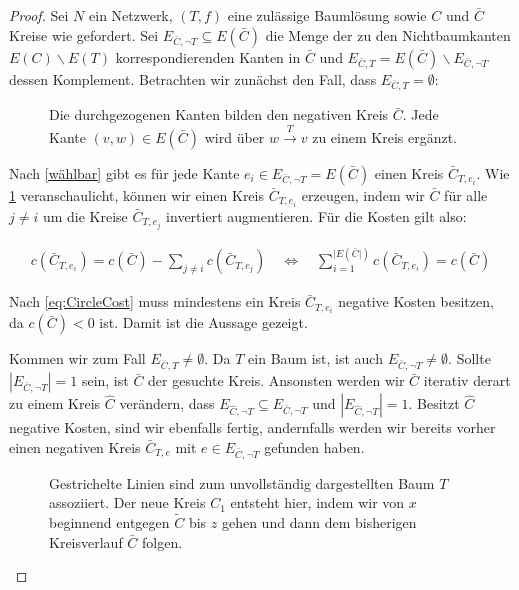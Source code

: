 \begin{proof}Sei $N$ ein Netzwerk, $(T,f)$ eine zulässige Baumlösung sowie $C$ und $\bar{C}$ Kreise wie gefordert. Sei $E_{\bar{C},\neg T}\subseteq E(\bar{C})$ die Menge der zu den Nichtbaumkanten $E(C)\backslash E(T)$ korrespondierenden Kanten in $\bar{C}$ und $E_{\bar{C},T}=E(\bar{C})\backslash E_{\bar{C},\neg T}$ dessen Komplement. Betrachten wir zunächst den Fall, dass $E_{\bar{C},T}=\emptyset$:

\begin{figure}[!ht]\centering
	
	\caption{Die durchgezogenen Kanten bilden den negativen Kreis $\bar{C}$. Jede Kante $(v,w)\in E(\bar{C})$ wird über $w\xrightarrow{T}v$ zu einem Kreis ergänzt.}
	\label{fig:NTC}
\end{figure}

Nach \cref{wählbar} gibt es für jede Kante $e_i\in E_{\bar{C},\neg T}=E(\bar{C})$ einen Kreis $\bar{C}_{T,e_i}$. Wie \cref{fig:NTC} veranschaulicht, können wir einen Kreis $\bar{C}_{T,e_i}$ erzeugen, indem wir $\bar{C}$ für alle $j\neq i$ um die Kreise $\bar{C}_{T,e_j}$ invertiert augmentieren. Für die Kosten gilt also:

\begin{align}
c(\bar{C}_{T,e_i})=c(\bar{C})-\sum_{j\neq i} c(\bar{C}_{T,e_j})
\quad\Leftrightarrow\quad\sum_{i=1}^{|E(\bar{C}|)} c(\bar{C}_{T,e_i})=c(\bar{C})\label{eq:CircleCost}
\end{align}

Nach \cref{eq:CircleCost} muss mindestens ein Kreis $\bar{C}_{T,e_i}$ negative Kosten besitzen, da $c(\bar{C})<0$ ist. Damit ist die Aussage gezeigt.

Kommen wir zum Fall $E_{\bar{C},T}\neq\emptyset$. Da $T$ ein Baum ist, ist auch $E_{\bar{C},\neg T}\neq\emptyset$. Sollte $|E_{\bar{C},\neg T}|=1$ sein, ist $\bar{C}$ der gesuchte Kreis. Ansonsten werden wir $\bar{C}$ iterativ derart zu einem Kreis $\hat{C}$ verändern, dass $E_{\hat{C},\neg T}\subseteq E_{\bar{C},\neg T}$ und $|E_{\hat{C},\neg T}|=1$. Besitzt $\hat{C}$ negative Kosten, sind wir ebenfalls fertig, andernfalls werden wir bereits vorher einen negativen Kreis $\bar{C}_{T,e}$ mit $e\in E_{\bar{C},\neg T}$ gefunden haben.

\begin{figure}[!ht]\centering
	
	\caption{Gestrichelte Linien sind zum unvollständig dargestellten Baum $T$ assoziiert. Der neue Kreis $C_1$ entsteht hier, indem wir von $x$ beginnend entgegen $\tilde{C}$ bis $z$ gehen und dann dem bisherigen Kreisverlauf $\bar{C}$ folgen.}
	\label{fig:TC}
\end{figure}


\end{proof}
